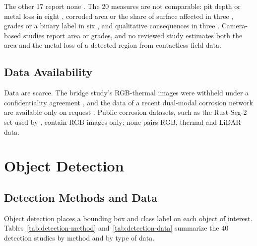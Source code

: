 The other 17 report none
\citep{Li2022,Nash2022,Nguyen2026,Doshvarpassand2022,Lavadiya2022,Maharjan2025,Mao2026,PallasEnguita2025,Khodabux2020,Yu2023,HerndonTien2025,DeKerf2022,Liang2021,Espinoza2026,Alvani2026,Imran2025,Yao2019}.
The 20 measures are not comparable: pit depth or metal loss in eight
\citep{Liu2026,Wang2021,Qin2026,Egodawela2025,Akhlaghi2023,Huang2026a,Khodabux2021a,Yang2025},
corroded area or the share of surface affected in three
\citep{Savino2025,Suzuki2026,Hu2023}, grades or a binary label in six
\citep{Bui2026,Hernndez-Surez2026,Rahman2021,Arias2025,Fu2024,Malashin2024}, and
qualitative consequences in three \citep{Elizalde2023,Wojciechowski2025,Yang2026a}.
Camera-based studies report area or grades, and no reviewed study estimates both
the area and the metal loss of a detected region from contactless field data.

\subsection{Data Availability}

Data are scarce. The bridge study's RGB-thermal images were withheld under a
confidentiality agreement \citep{Lim2021}, and the data of a recent dual-modal
corrosion network are available only on request \citep{Mao2026}. Public corrosion
datasets, such as the Rust-Seg-2 set used by \citet{Espinoza2026}, contain RGB
images only; none pairs RGB, thermal and LiDAR data.

\section{Object Detection}
\label{sec:lr-detection}

\subsection{Detection Methods and Data}

Object detection places a bounding box and class label on each object of
interest. Tables~\ref{tab:detection-method} and~\ref{tab:detection-data} summarize
the 40 detection studies by method and by type of data.

